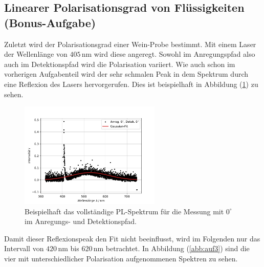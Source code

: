 \subsection{Linearer Polarisationsgrad von Flüssigkeiten (Bonus-Aufgabe)}
\label{sec:3}
Zuletzt wird der Polarisationsgrad einer Wein-Probe bestimmt.
Mit einem Laser der Wellenl\"{a}nge von $405 \, $nm wird diese angeregt.
Sowohl im Anregungspfad also auch im Detektionspfad wird die Polarisation variiert.
Wie auch schon im vorherigen Aufgabenteil wird der sehr schmalen Peak in dem Spektrum durch eine Reflexion des Lasers hervorgerufen.
Dies ist beispielhaft in Abbildung (\ref{abb:auf3_P1_bsp}) zu sehen.
\begin{figure}[hbtp]
\centering
	\includegraphics[width=0.6\textwidth]{Plots/aufgabe3_P1.pdf}
	\caption{Beispielhaft das vollst\"{a}ndige PL-Spektrum f\"{u}r die Messung mit $0^{\circ}$ im Anregungs- und Detektionspfad.}
	\label{abb:auf3_P1_bsp}
\end{figure}
Damit dieser Reflexionspeak den Fit nicht beeinflusst, wird im Folgenden nur das Intervall von $420 \,$nm bis $620 \,$nm betrachtet.
In Abbildung (\ref{abb:auf3}) sind die vier mit unterschiedlicher Polarisation aufgenommenen Spektren zu sehen.
